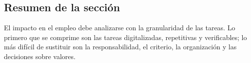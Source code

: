 \subsection{Resumen de la sección}

El impacto en el empleo debe analizarse con la granularidad de las tareas. Lo primero que se comprime son las tareas digitalizadas, repetitivas y verificables; lo más difícil de sustituir son la responsabilidad, el criterio, la organización y las decisiones sobre valores.
